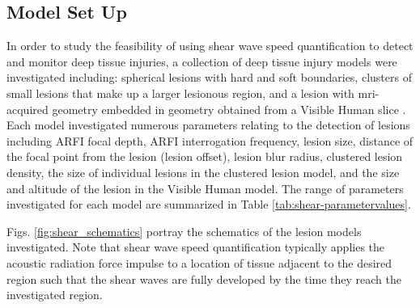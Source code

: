 		\subsection{Model Set Up}
		\label{subsec:model_setup}
			In order to study the feasibility of using shear wave speed quantification to detect and monitor deep tissue injuries, a collection of deep tissue injury models were investigated including: spherical lesions with hard and soft boundaries, clusters of small lesions that make up a larger lesionous region, and a lesion with mri-acquired geometry \cite{solis13} embedded in geometry obtained from a Visible Human slice \cite{visiblehuman}. Each model investigated numerous parameters relating to the detection of lesions including ARFI focal depth, ARFI interrogation frequency, lesion size, distance of the focal point from the lesion (lesion offset), lesion blur radius, clustered lesion density, the size of individual lesions in the clustered lesion model, and the size and altitude of the lesion in the Visible Human model. The range of parameters investigated for each model are summarized in Table \ref{tab:shear-parametervalues}.

			Figs. \ref{fig:shear_schematics} portray the schematics of the lesion models investigated. Note that shear wave speed quantification typically applies the acoustic radiation force impulse to a location of tissue adjacent to the desired region such that the shear waves are fully developed by the time they reach the investigated region.


